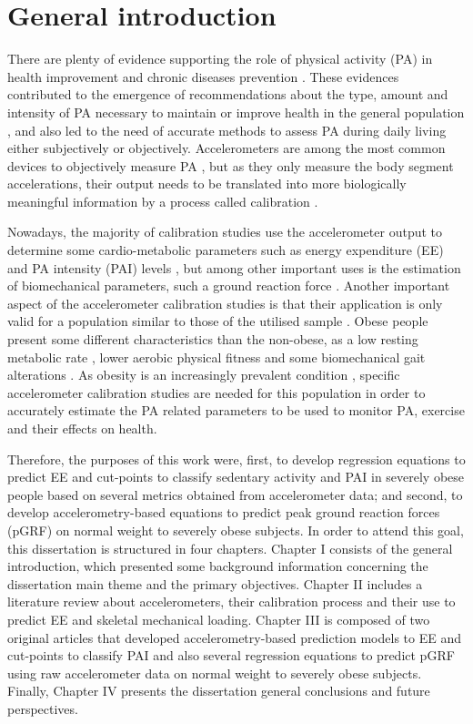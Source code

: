 \documentclass[12pt]{article}
\begin{document}
\section*{General introduction}

There are plenty of evidence supporting the role of physical activity (PA) in health improvement and chronic diseases prevention \cite{Guthold_2018, Warburton_2017, Warburton_2006}. These evidences contributed to the emergence of recommendations about the type, amount and intensity of PA necessary to maintain  or improve health in the general population \cite{WHO_2010}, and also led to the need of accurate methods to assess PA during daily living \cite{Montoye_2000, Plasqui_2013} either subjectively or objectively. Accelerometers are among the most common devices to objectively measure PA \cite{Strath_2013}, but as they only measure the body segment accelerations, their output needs to be translated into more biologically meaningful information by a process called calibration \cite{Welk_2005}.
 
 Nowadays, the majority of calibration studies use the accelerometer output to determine some cardio-metabolic parameters such as energy expenditure (EE) and PA intensity (PAI) levels \cite{Migueles_2017}, but among other important uses is the estimation of biomechanical parameters, such a ground reaction force \cite{Neugebauer_2014}. Another important aspect of the accelerometer calibration studies is that their application is only valid for a population similar to those of the utilised sample \cite{Welk_2005}. Obese people present some different characteristics than the non-obese, as a low resting metabolic rate \cite{Byrne_2005}, lower aerobic physical fitness \cite{Souza_2010} and some biomechanical gait alterations \cite{Bode_2019}. As obesity is an increasingly prevalent condition \cite{Guthold_2018}, specific accelerometer calibration studies are needed for this population in order to accurately estimate the PA related parameters to be used to monitor PA, exercise and their effects on health.

Therefore, the purposes of this work were, first, to develop regression equations to predict EE and cut-points to classify sedentary activity and PAI in severely obese people based on several metrics obtained from accelerometer data; and second, to develop accelerometry-based equations to predict peak ground reaction forces (pGRF) on normal weight to severely obese subjects. In order to attend this goal, this dissertation is structured in four chapters. Chapter I consists of the general introduction, which presented some background information concerning the dissertation main theme and the primary objectives. Chapter II includes a literature review about accelerometers, their calibration process and their use to predict EE and skeletal mechanical loading. Chapter III is composed of two original articles that developed accelerometry-based prediction models to EE and cut-points to classify PAI and also several regression equations to predict pGRF using raw accelerometer data on normal weight to severely obese subjects. Finally, Chapter IV presents the  dissertation general conclusions and future perspectives.

\pagebreak



\end{document}
